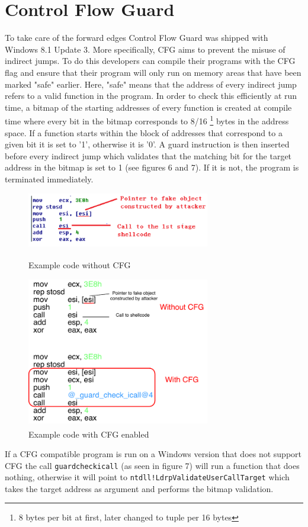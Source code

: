 \documentclass[10pt,twocolumn,a4paper]{article}
\begin{document}
\section{Control Flow Guard}\label{CFG}
To take care of the forward edges Control Flow Guard was shipped with Windows 8.1 Update 3.
More specifically, CFG aims to prevent the misuse of indirect jumps.
To do this developers can compile their programs with the CFG flag and ensure that their program will only run on memory areas that have been marked "safe" earlier\cite{CFG2}.
Here, "safe" means that the address of every indirect jump refers to a valid function in the program.
In order to check this efficiently at run time, a bitmap of the starting addresses of every function is created at compile time where every bit in the bitmap corresponds to 8/16 \footnote{8 bytes per bit at first, later changed to tuple per 16 bytes} bytes in the address space.
If a function starts within the block of addresses that correspond to a given bit it is set to '1', otherwise it is '0'.
A guard instruction is then inserted before every indirect jump which validates that the matching bit for the target address in the bitmap is set to 1 (see figures 6 and 7). If it is not, the program is terminated immediately.
\begin{figure}[htbp]
	\includegraphics[keepaspectratio,width=8cm]{fig/nocfg}
	\caption{Example code without CFG\textsuperscript{\cite{cfgexplore}}}
	\includegraphics[keepaspectratio,width=8cm]{fig/cfg}
	\caption{Example code with CFG enabled\textsuperscript{\cite{cfgexplore}}}
\end{figure}
If a CFG compatible program is run on a Windows version that does not support CFG the call \texttt{\textunderscore guard\textunderscore check\textunderscore icall} (as seen in figure 7) will run a function that does nothing, otherwise it will point to \texttt{ntdll!LdrpValidateUserCallTarget} which takes the target address as argument and performs the bitmap validation\cite{cfgexplore}.
\end{document}
